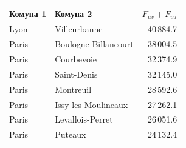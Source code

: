 \begin{tabular}{llr}
\toprule
Комуна 1 & Комуна 2 & $F_{uv}+F_{vu}$\\
\midrule
Lyon & Villeurbanne & 40\,884.7\\
Paris & Boulogne-Billancourt & 38\,004.5\\
Paris & Courbevoie & 32\,374.9\\
Paris & Saint-Denis & 32\,145.0\\
Paris & Montreuil & 28\,592.6\\
Paris & Issy-les-Moulineaux & 27\,262.1\\
Paris & Levallois-Perret & 26\,051.6\\
Paris & Puteaux & 24\,132.4\\
\bottomrule
\end{tabular}

